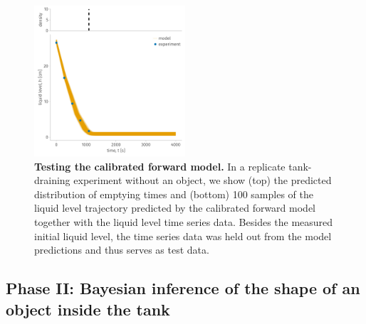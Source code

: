 \documentclass[openacc]{rsproca_new}%
\begin{document}
\begin{figure}[h!]
    \centering
    	\includegraphics[width=0.5\textwidth]{../test.pdf}
    \caption{
      \textbf{Testing the calibrated forward model.}
      In a replicate tank-draining experiment without an object, we show (top) the predicted distribution of emptying times and (bottom) 100 samples of the liquid level trajectory predicted by the calibrated forward model together with the liquid level time series data. Besides the measured initial liquid level, the time series data was held out from the model predictions and thus serves as test data.
      } \label{fig:test}
\end{figure}

\subsection{Phase II: Bayesian inference of the shape of an object inside the tank}
\end{document}
